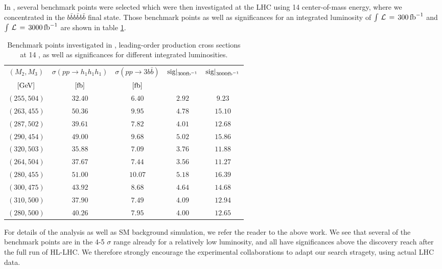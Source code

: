 In \cite{Papaefstathiou:2020lyp}, several benchmark points were selected which were then investigated at the LHC using 14 \TeV center-of-mass energy, where we concentrated in the $b\bar{b}b\bar{b}b\bar{b}$ final state. Those benchmark points as well as significances for an integrated luminosity of $\int\,\mathcal{L}\,=\,300\,{\rm fb}^{-1}$ and  $\int\,\mathcal{L}\,=\,3000\,{\rm fb}^{-1}$ are shown in table \ref{tab:hhh}.
\begin{center}
\begin{table}
{\small
\begin{center}
\begin{tabular}{c||cc||cc}\\
{\bf $(M_2, M_3)$}& $\sigma(pp\rightarrow h_1 h_1 h_1)$ &
$\sigma(pp\rightarrow 3 b \bar{b})$&$\text{sig}|_{300\rm{fb}^{-1}}$& $\text{sig}|_{3000\rm{fb}^{-1}}$\\
${[{\rm GeV}]}$ & ${[{\rm fb}]}$  & ${[{\rm fb}]}$ & &\\
\hline\hline
$(255, 504)$ & $32.40$ & $6.40$&$2.92$&{  $9.23$}\\
$(263, 455)$ & $50.36$ & $9.95$&{ $4.78$}&{  $15.10 $}\\
$(287, 502)$ & $39.61$ & $7.82$&{  $4.01$} &{  $12.68$}\\
$(290, 454)$ & $49.00$ & $9.68$&{  $5.02$}&{  $15.86 $}\\
$(320, 503)$ & $35.88$& $7.09$& {  $3.76 $}&{  $11.88$}\\
$(264, 504)$ & $37.67$ & $7.44$&{  $3.56 $}&{  $11.27 $}\\
$(280, 455)$& $51.00$ & $10.07$&{  $5.18$} &{  $16.39$}\\
$(300, 475)$&$43.92$& $8.68$&{  $4.64 $}&{  $14.68 $}\\
$(310, 500)$& $37.90$ & $7.49$&{  $4.09 $}&{  $12.94$}\\
$(280, 500)$& $40.26$& $7.95$&{  $4.00 $}&{  $12.65 $}\\
\end{tabular}
\end{center}}
\caption{Benchmark points investigated in \cite{Papaefstathiou:2020lyp}, {leading-order} production cross sections at 14 \TeV, as well as significances for different integrated luminosities.}
\label{tab:hhh}
\end{table}
\end{center}
For details of the analysis as well as SM background simulation, we refer the reader to the above work. We see that several of the benchmark points are in the 4-5 $\sigma$ range already for a relatively low luminosity, and all have significances above the discovery reach after the full run of HL-LHC. We therefore strongly encourage the experimental collaborations to adapt our search stragety, using actual LHC data.

